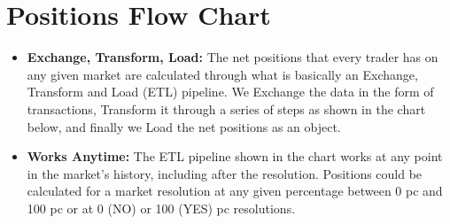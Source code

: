 \documentclass{article}
\begin{document}
\section{Positions Flow Chart}

\begin{itemize}
    \item \textbf{Exchange, Transform, Load:} The net positions that every trader has on any given market are calculated through what is basically an Exchange, Transform and Load (ETL) pipeline. We Exchange the data in the form of transactions, Transform it through a series of steps as shown in the chart below, and finally we Load the net positions as an object.
    \item \textbf{Works Anytime:} The ETL pipeline shown in the chart works at any point in the market's history, including after the resolution. Positions could be calculated for a market resolution at any given percentage between 0 pc and 100 pc or at 0 (NO) or 100 (YES) pc resolutions.
\end{itemize}
\end{document}
